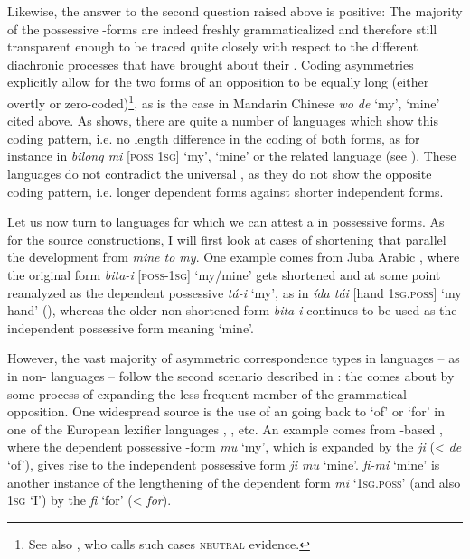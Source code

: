 \documentclass[output=paper]{langsci/langscibook}
\begin{document}
Likewise, the answer to the second question raised above is positive: The majority of the possessive -forms are indeed freshly grammaticalized and therefore still transparent enough to be traced quite closely with respect to the different diachronic processes that have brought about their . 
\newpage
Coding asymmetries explicitly allow for the two forms of an opposition to be equally long (either overtly or zero-coded)\footnote{See also \citet[58f.]{Croft1991}, who calls such cases \textsc{neutral} evidence.}, as is the case in Mandarin  Chinese \textit{wo de} ‘my’, ‘mine’ cited above. As  shows, there are quite a number of  languages which show this coding pattern, i.e. no length difference in the coding of both forms, as for instance in  \textit{bilong mi} [\textsc{poss} \textsc{1sg}] ‘my’, ‘mine’ or the related language  (see ). These languages do not contradict the universal , as they do not show the opposite coding pattern, i.e. longer dependent forms against shorter independent forms.

Let us now turn to  languages for which we can attest a  in possessive forms. As for the source constructions, I will first look at cases of shortening that parallel the  development from \textit{mine to my}. One example comes from Juba Arabic , where the original form \textit{bita-i} [\textsc{poss-1sg}] ‘my/mine’ gets shortened and at some point reanalyzed as the dependent possessive \textit{tá-i} ‘my’, as in \textit{ída tái} [hand \textsc{1sg.poss}] ‘my hand’ (\citealt{ManfrediPetrollino2013}), whereas the older non-shortened form \textit{bita-i} continues to be used as the independent possessive form meaning ‘mine’. 

However, the vast majority of asymmetric correspondence types in  languages – as in non- languages – follow the second scenario described in : the  comes about by some process of expanding the less frequent member of the grammatical opposition. One widespread source is the use of an  going back to ‘of’ or ‘for’ in one of the European lexifier languages , ,  etc. An example comes from -based  \citep{Hagemeijer2013}, where the dependent possessive -form \textit{mu} ‘my’, which is expanded by the   \textit{ji} (<  \textit{de} ‘of’), gives rise to the independent possessive form \textit{ji mu} ‘mine’.  \textit{fi-mi} ‘mine’ is another instance of the lengthening of the dependent form \textit{mi} \textsc{‘1sg.poss’} (and also 1\textsc{sg} ‘I’) by the  \textit{fi} ‘for’ (<  \textit{for}).
\end{document}
